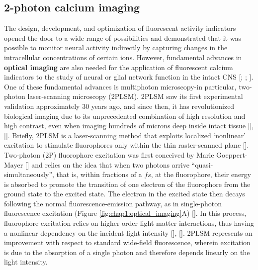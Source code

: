 \subsection{2-photon calcium imaging}
\label{chap1:sec:1:subsec4:2_photon_imaging}

The design, development, and optimization of fluorescent activity indicators opened the door to a wide range of possibilities and demonstrated that it was possible to monitor neural activity indirectly by capturing changes in the intracellular concentrations of certain ions. 
However, fundamental advances in \textbf{optical imaging} are also needed for the application of fluorescent calcium indicators to the study of neural or glial network function in the intact CNS [\cite{grienberger2012}; \cite{bovetti2014}; \cite{yang2017}].
One of these fundamental advances is multiphoton microscopy-in particular, two-photon laser-scanning microscopy (2PLSM).
2PLSM saw its first experimental validation approximately 30 years ago, and since then, it has revolutionized biological imaging due to its unprecedented combination of high resolution and high contrast, even when imaging hundreds of microns deep inside intact tissue [\cite{denk1994}], [\cite{helmchen2005}].
Briefly, 2PLSM is a laser-scanning method that exploits localized ‘nonlinear’ excitation to stimulate fluorophores only within the thin raster-scanned plane [\cite{zipfel2003}]. 
Two-photon (2P) fluorophore excitation was first conceived by Marie Goeppert-Mayer [\cite{goppertmayer1931}] and relies on the idea that when two photons arrive \enquote{quasi-simultaneously}, that is, within fractions of a $fs$, at the fluorophore, their energy is absorbed to promote the transition of one electron of the fluorophore from the ground state to the excited state.
The electron in the excited state then decays following the normal fluorescence-emission pathway, as in single-photon fluorescence excitation (Figure \ref{fig:chap1:optical_imaging}A) [\cite{pawley2006}].
In this process, fluorophore excitation relies on higher-order light-matter interactions, thus having a nonlinear dependency on the incident light intensity [\cite{svoboda2006}], [\cite{helmchen2005}]. 
2PLSM represents an improvement with respect to standard wide-field fluorescence, wherein excitation is due to the absorption of a single photon and therefore depends linearly on the light intensity. 
